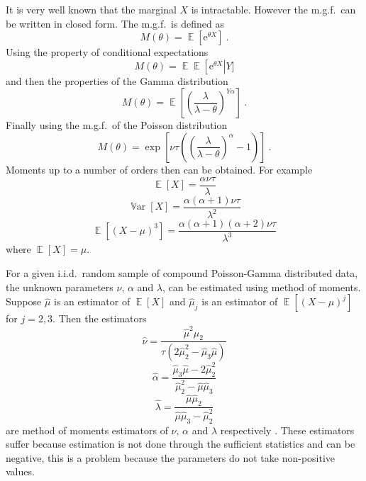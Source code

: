 \documentclass[a4paper]{proc}
\DeclareMathOperator{\expectation}{\mathbb{E}}
\DeclareMathOperator{\variance}{\mathbb{V}ar}
\newcommand{\euler}{\mathrm{e}}
\begin{document}
It is very well known that the marginal $X$ is intractable. However the m.g.f.~can be written in closed form. The m.g.f.~is defined as
\begin{equation}
M(\theta)=\expectation\left[\euler^{\theta X}\right] \ .
\end{equation}
Using the property of conditional expectations
\begin{equation*}
M(\theta)=\expectation\expectation\left[\euler^{\theta X}\right|Y]
\end{equation*}
and then the properties of the Gamma distribution
\begin{equation*}
M(\theta)=\expectation\left[\left(\frac{\lambda}{\lambda-\theta}\right)^{Y\alpha}\right] \ .
\end{equation*}
Finally using the m.g.f.~of the Poisson distribution
\begin{equation}
M(\theta)=\exp\left[\nu\tau\left(\left(\frac{\lambda}{\lambda-\theta}\right)^{\alpha}-1\right)\right] \ .
\end{equation}
Moments up to a number of orders then can be obtained. For example
\begin{equation}
\expectation\left[X\right]=\frac{\alpha\nu\tau}{\lambda}
\end{equation}
\begin{equation}
\variance\left[X\right]=\frac{\alpha(\alpha+1)\nu\tau}{\lambda^2}
\end{equation}
\begin{equation}
\expectation\left[(X-\mu)^3\right] = \frac{\alpha(\alpha+1)(\alpha+2)\nu\tau}{\lambda^3}
\end{equation}
where $\expectation\left[X\right]=\mu$.

For a given i.i.d.~random sample of compound Poisson-Gamma distributed data, the unknown parameters $\nu$, $\alpha$ and $\lambda$, can be estimated using method of moments. Suppose $\widehat{\mu}$ is an estimator of $\expectation[X]$ and $\widehat{\mu}_j$ is an estimator of $\expectation\left[\left(X-\mu\right)^j\right]$ for $j=2,3$. Then the estimators
\begin{equation}
\widehat{\nu}=\frac{\widehat{\mu}^2\widehat{\mu}_2}{\tau\left(2\widehat{\mu}_2^2-\widehat{\mu}_3\widehat{\mu}\right)}
\end{equation}
\begin{equation}
\widehat{\alpha}=\frac{\widehat{\mu}_3\widehat{\mu}-2\widehat{\mu}_2^2}{\widehat{\mu}_2^2-\widehat{\mu}\widehat{\mu}_3}
\end{equation}
\begin{equation}
\widehat{\lambda}=\frac{\widehat{\mu}\widehat{\mu}_2}{\widehat{\mu}\widehat{\mu}_3-\widehat{\mu}_2^2}
\end{equation}
are method of moments estimators of $\nu$, $\alpha$ and $\lambda$ respectively \cite{withers2011compound}. These estimators suffer because estimation is not done through the sufficient statistics and can be negative, this is a problem because the parameters do not take non-positive values.
\end{document}
